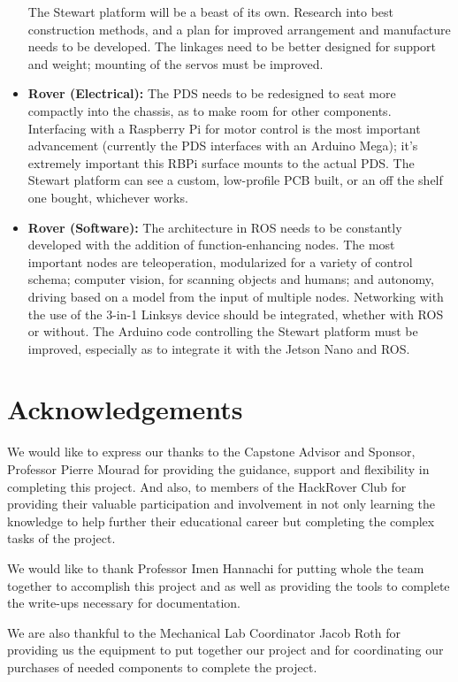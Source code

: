 \documentclass[a4paper, 10pt]{article}
\begin{document}
\begin{itemize}
		The Stewart platform will be a beast of its own. Research into best construction methods, and a plan for improved arrangement and manufacture needs to be developed. The linkages need to be better designed for support and weight; mounting of the servos must be improved.
		
		\item \textbf{Rover (Electrical):} The PDS needs to be redesigned to seat more compactly into the chassis, as to make room for other components. Interfacing with a Raspberry Pi for motor control is the most important advancement (currently the PDS interfaces with an Arduino Mega); it's extremely important this RBPi surface mounts to the  actual PDS. The Stewart platform can see a custom, low-profile PCB built, or an off the shelf one bought, whichever works.
		
		\item \textbf{Rover (Software):} The architecture in ROS needs to be constantly developed with the addition of function-enhancing nodes. The most important nodes are teleoperation, modularized for a variety of control schema; computer vision, for scanning objects and humans; and autonomy, driving based on a model from the input of multiple nodes. Networking with the use of the 3-in-1 Linksys device should be integrated, whether with ROS or without. The Arduino code controlling the Stewart platform must be improved, especially as to integrate it with the Jetson Nano and ROS.  
	\end{itemize}
	
\section{Acknowledgements}

	We would like to express our thanks to the Capstone Advisor and Sponsor, Professor Pierre Mourad for providing the guidance, support and flexibility in completing this project. And also, to members of the HackRover Club for providing their valuable participation and involvement in not only learning the knowledge to help further their educational career but completing the complex tasks of the project.
	
	We would like to thank Professor Imen Hannachi for putting whole the team together to accomplish this project and as well as providing the tools to complete the write-ups necessary for documentation.
	
	We are also thankful to the Mechanical Lab Coordinator Jacob Roth for providing us the equipment to put together our project and for coordinating our purchases of needed components to complete the project.
	
\end{document}
